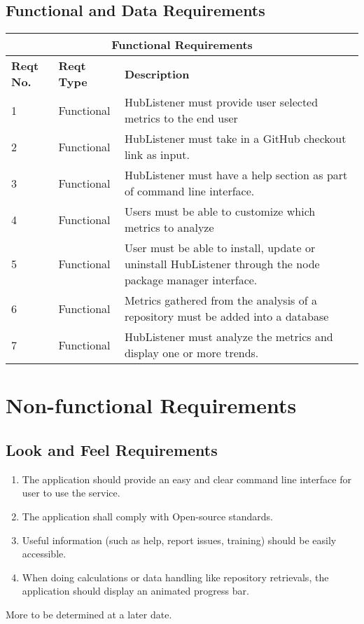 \documentclass{article}
\begin{document}
\subsection{Functional and Data Requirements }
\begin{tabular}{ |p{1cm}|p{3cm}|p{5cm}| }
\hline
\multicolumn{3}{|c|}{\textbf{Functional Requirements}} \\
\hline
\textbf{Reqt No.} & \textbf{Reqt Type} & \textbf{Description} \\
\hline 
1 & Functional & HubListener must provide user selected metrics to the end user\\
\hline 
2 & Functional & HubListener must take in a GitHub checkout link as input. \\
\hline 
3 & Functional & HubListener must have a help section as part of command line interface.\\ 
\hline 
4 & Functional & Users must be able to customize which metrics to analyze \\
\hline 
5 & Functional & User must be able to install, update or uninstall HubListener through the node package manager interface.\\
\hline 
6 & Functional & Metrics gathered from the analysis of a repository must be added into a database \\
\hline 
7 & Functional & HubListener must analyze the metrics and display one or more trends. \\
\hline
\end{tabular}


\newpage
\section{Non-functional Requirements}

\subsection{Look and Feel Requirements}
\begin{enumerate}
\item The application should provide an easy and clear command line interface for user to use the service.
\item The application shall comply with Open-source standards.
\item Useful information (such as help, report issues, training) should be easily accessible.
\item When doing calculations or data handling like repository retrievals, the application should display an animated progress bar. 
\end{enumerate}
More to be determined at a later date.
\end{document}

